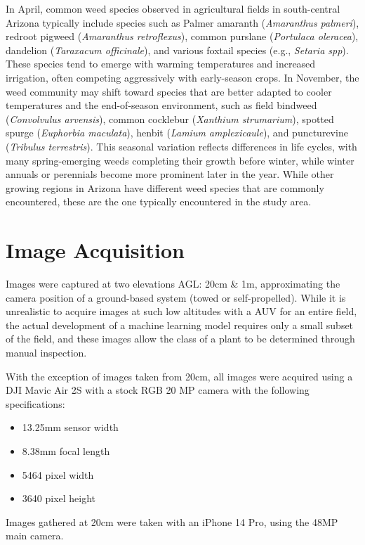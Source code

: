\documentclass[letterpaper, notitlepage]{report}
\begin{document}
In April, common weed species observed in agricultural fields in south-central Arizona typically include species such as Palmer amaranth (\textit{Amaranthus palmeri}), redroot pigweed (\textit{Amaranthus retroflexus}), common purslane (\textit{Portulaca oleracea}), dandelion (\textit{Taraxacum officinale}), and various foxtail species (e.g., \textit{Setaria spp}). These species tend to emerge with warming temperatures and increased irrigation, often competing aggressively with early-season crops. In November, the weed community may shift toward species that are better adapted to cooler temperatures and the end-of-season environment, such as field bindweed (\textit{Convolvulus arvensis}), common cocklebur (\textit{Xanthium strumarium}), spotted spurge (\textit{Euphorbia maculata}), henbit (\textit{Lamium amplexicaule}), and puncturevine (\textit{Tribulus terrestris}). This seasonal variation reflects differences in life cycles, with many spring-emerging weeds completing their growth before winter, while winter annuals or perennials become more prominent later in the year. While other growing regions in Arizona have different weed species that are commonly encountered, these are the one typically encountered in the study area. 


\section{Image Acquisition}
Images were captured at two elevations \gls{AGL}: 20cm \& 1m, approximating the camera position of a ground-based system (towed or self-propelled). While it is unrealistic to acquire images at such low altitudes with a AUV for an entire field, the actual development of a machine learning model requires only a small subset of the field, and these images allow the class of a plant to be determined through manual inspection.

With the exception of images taken from 20cm, all images were acquired using a DJI Mavic Air 2S with a stock RGB 20 MP camera with the following specifications:

\begin{itemize}
	\item{13.25mm sensor width}
	\item{8.38mm focal length}
	\item{5464 pixel width}
	\item{3640 pixel height}
\end{itemize}

Images gathered at 20cm were taken with an iPhone 14 Pro, using the 48MP main camera.
\end{document}

